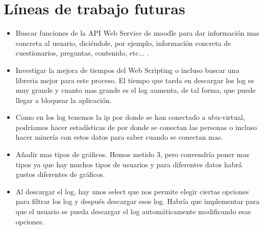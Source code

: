 \section{Líneas de trabajo futuras}\label{luxedneas-de-trabajo-futuras}

\begin{itemize}
	\tightlist
	\item
	Buscar funciones de la API Web Service de moodle para dar información mas concreta al usuario, diciéndole, por ejemplo, información concreta de cuestionarios, preguntas, contenido, etc... .
	\item
	Investigar la mejora de tiempos del Web Scripting o incluso buscar una libreria mejor para este proceso. El tiempo que tarda en descargar los log es muy grande y cuanto mas grande es el log aumenta, de tal forma, que puede llegar a bloquear la aplicación.
	\item
	Como en los log tenemos la ip por donde se han conectado a ubu-virtual, podríamos hacer estadísticas de por donde se conectan las personas o incluso hacer minería con estos datos para saber cuando se conectan mas.
	\item
	Añadir mas tipos de gráficos. Hemos metido 3, pero convendría poner mas tipos ya que hay muchos tipos de usuarios y para diferentes datos habrá gustos diferentes de gráficos.
	\item
	Al descargar el log, hay unos select que nos permite elegir ciertas opciones para filtrar los log y después descargar esos log. Habría que implementar para que el usuario se pueda descargar el log automáticamente modificando esas opciones.
	
\end{itemize}
